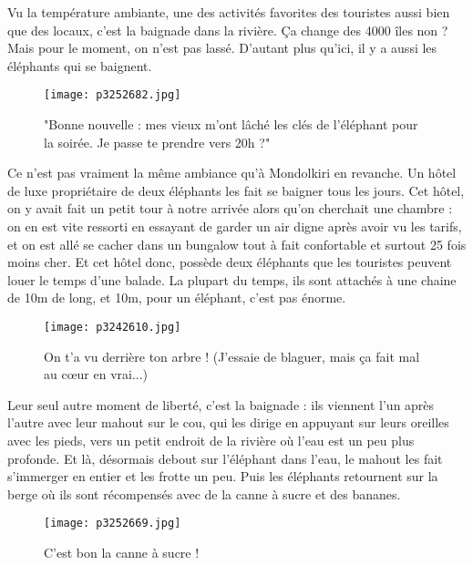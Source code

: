 \documentclass{book}
\begin{document}
Vu la température ambiante, une des activités favorites des touristes aussi bien que des locaux, c'est la baignade dans la rivière. Ça change des 4000 îles non ? Mais pour le moment, on n'est pas lassé. D'autant plus qu'ici, il y a aussi les éléphants qui se baignent.


\begin{figure}[h]
\centering
\texttt{[image: p3252682.jpg]}
\caption*{"Bonne nouvelle : mes vieux m'ont lâché les clés de l'éléphant pour la soirée. Je passe te prendre vers 20h ?"}
\end{figure}

Ce n'est pas vraiment la même ambiance qu'à Mondolkiri en revanche. Un hôtel de luxe propriétaire de deux éléphants les fait se baigner tous les jours. Cet hôtel, on y avait fait un petit tour à notre arrivée alors qu'on cherchait une chambre : on en est vite ressorti en essayant de garder un air digne après avoir vu les tarifs, et on est allé se cacher dans un bungalow tout à fait confortable et surtout 25 fois moins cher. Et cet hôtel donc, possède deux éléphants que les touristes peuvent louer le temps d'une balade. La plupart du temps, ils sont attachés à une chaine de 10m de long, et 10m, pour un éléphant, c'est pas énorme.


\begin{figure}[h]
\centering
\texttt{[image: p3242610.jpg]}
\caption*{On t'a vu derrière ton arbre ! (J'essaie de blaguer, mais ça fait mal au cœur en vrai...)}
\end{figure}

Leur seul autre moment de liberté, c'est la baignade : ils viennent l'un après l'autre avec leur mahout sur le cou, qui les dirige en appuyant sur leurs oreilles avec les pieds, vers un petit endroit de la rivière où l'eau est un peu plus profonde. Et là, désormais debout sur l'éléphant dans l'eau, le mahout les fait s'immerger en entier et les frotte un peu. Puis les éléphants retournent sur la berge où ils sont récompensés avec de la canne à sucre et des bananes.


\begin{figure}[h]
\centering
\texttt{[image: p3252669.jpg]}
\caption*{C'est bon la canne à sucre !}
\end{figure}
\end{document}
